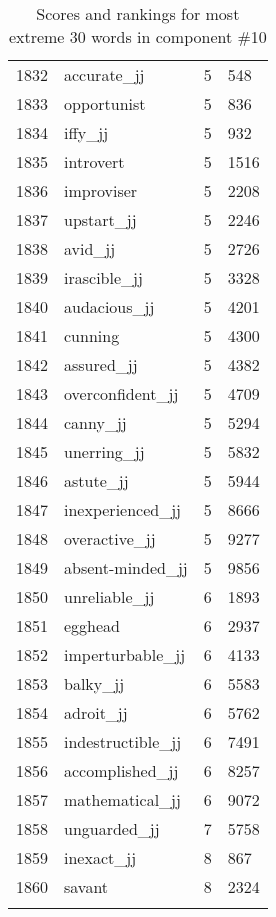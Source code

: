 \begin{longtable}[!htbp]{| rlr@{.}l |}
    1832 & accurate\_jj & 5 & 548 \\
    1833 & opportunist & 5 & 836 \\
    1834 & iffy\_jj & 5 & 932 \\
    1835 & introvert & 5 & 1516 \\
    1836 & improviser & 5 & 2208 \\
    1837 & upstart\_jj & 5 & 2246 \\
    1838 & avid\_jj & 5 & 2726 \\
    1839 & irascible\_jj & 5 & 3328 \\
    1840 & audacious\_jj & 5 & 4201 \\
    1841 & cunning & 5 & 4300 \\
    1842 & assured\_jj & 5 & 4382 \\
    1843 & overconfident\_jj & 5 & 4709 \\
    1844 & canny\_jj & 5 & 5294 \\
    1845 & unerring\_jj & 5 & 5832 \\
    1846 & astute\_jj & 5 & 5944 \\
    1847 & inexperienced\_jj & 5 & 8666 \\
    1848 & overactive\_jj & 5 & 9277 \\
    1849 & absent-minded\_jj & 5 & 9856 \\
    1850 & unreliable\_jj & 6 & 1893 \\
    1851 & egghead & 6 & 2937 \\
    1852 & imperturbable\_jj & 6 & 4133 \\
    1853 & balky\_jj & 6 & 5583 \\
    1854 & adroit\_jj & 6 & 5762 \\
    1855 & indestructible\_jj & 6 & 7491 \\
    1856 & accomplished\_jj & 6 & 8257 \\
    1857 & mathematical\_jj & 6 & 9072 \\
    1858 & unguarded\_jj & 7 & 5758 \\
    1859 & inexact\_jj & 8 & 867 \\
    1860 & savant & 8 & 2324 \\
    \hline
    \caption{Scores and rankings for most extreme 30 words in component \#10} \\
\end{longtable}
